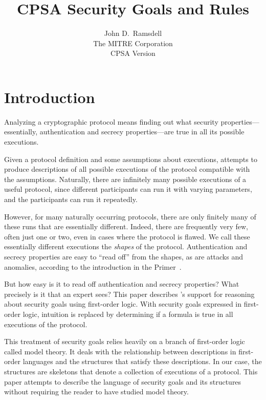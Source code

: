 \documentclass[12pt]{article}
\title{CPSA Security Goals and Rules}
\author{John D.~Ramsdell\\
  The MITRE Corporation\\ CPSA Version \version}
\begin{document}
\maketitle
\cpsacopying

\tableofcontents

\newpage

\listoffigures

\listoftables

\newpage

\section{Introduction}

\begin{sloppypar}
Analyzing a cryptographic protocol means finding out what security
properties---essentially, authentication and secrecy properties---are
true in all its possible executions.
\end{sloppypar}

Given a protocol definition and some assumptions about executions,
{\cpsa} attempts to produce descriptions of all possible executions of
the protocol compatible with the assumptions.  Naturally, there are
infinitely many possible executions of a useful protocol, since
different participants can run it with varying parameters, and the
participants can run it repeatedly.

However, for many naturally occurring protocols, there are only
finitely many of these runs that are essentially different.  Indeed,
there are frequently very few, often just one or two, even in cases
where the protocol is flawed.  We call these essentially different
executions the \emph{shapes} of the protocol.  Authentication and
secrecy properties are easy to ``read off'' from the shapes, as are
attacks and anomalies, according to the introduction in the {\cpsa}
Primer~\cite{cpsaprimer09}.

But how easy is it to read off authentication and secrecy properties?
What precisely is it that an expert sees?  This paper describes
{\cpsa}'s support for reasoning about security goals using first-order
logic.  With security goals expressed in first-order logic, intuition
is replaced by determining if a formula is true in all executions of
the protocol.


This treatment of security goals relies heavily on a branch of
first-order logic called model theory.  It deals with the relationship
between descriptions in first-order languages and the structures that
satisfy these descriptions.  In our case, the structures are skeletons
that denote a collection of executions of a protocol.  This paper
attempts to describe the language of security goals and its
structures without requiring the reader to have studied model theory.
\end{document}
